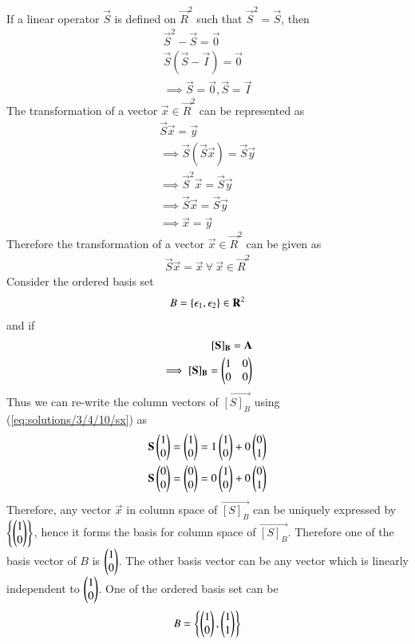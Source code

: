 If a linear operator $\vec{S}$ is defined on $\vec{R}^2$ such that $\vec{S}^2=\vec{S}$, then
\begin{align}
	\vec{S}^2-\vec{S}=\vec{0}\\
	\vec{S}(\vec{S}-\vec{I})=\vec{0}\\
	\implies\vec{S}=\vec{0},\vec{S}=\vec{I}
\end{align}
The transformation of a vector $\vec{x} \in \vec{R}^2$ can be represented as
\begin{align}
	\vec{S}\vec{x}=\vec{y}\\
	\implies \vec{S}(\vec{S}\vec{x})=\vec{S}\vec{y}\\
	\implies \vec{S}^2\vec{x}=\vec{S}\vec{y}\\
	\implies \vec{S}\vec{x}=\vec{S}\vec{y}\\
	\implies \vec{x}=\vec{y}
\end{align}
Therefore the transformation of a vector $\vec{x} \in \vec{R}^2$ can be given as
\begin{align}
	\vec{S}\vec{x}=\vec{x} \ \forall \ \vec{x} \in \vec{R}^2 \label{eq:solutions/3/4/10/sx}
\end{align}
Consider the ordered basis set
\begin{align}
        B=\left\{\epsilon_1,\epsilon_2\right\} \in \mathbf{R}^2
\end{align}
and if
\begin{align}
\mathbf{[S]_B}=\mathbf{A} \\
        \implies \mathbf{[S]_B}=\begin{pmatrix}1&0\\0&0\end{pmatrix}
\end{align}
Thus we can re-write the column vectors of $\vec{[S]_B}$ using (\ref{eq:solutions/3/4/10/sx}) as
\begin{align}
\mathbf{S}\begin{pmatrix}1\\0\end{pmatrix}=\begin{pmatrix}1\\0\end{pmatrix}=1\begin{pmatrix}1\\0\end{pmatrix}+0\begin{pmatrix}0\\1\end{pmatrix} \\
\mathbf{S}\begin{pmatrix}0\\0\end{pmatrix}=\begin{pmatrix}0\\0\end{pmatrix}=0\begin{pmatrix}1\\0\end{pmatrix}+0\begin{pmatrix}0\\1\end{pmatrix}
\end{align}
Therefore, any vector $\vec{x}$ in column space of $\vec{[S]_B}$ can be uniquely expressed by 
$\left\{\begin{pmatrix}1\\0\end{pmatrix}\right\}$, hence it forms the basis for column space of $\vec{[S]_B}$. Therefore 
one of the basis vector of $B$ is $\begin{pmatrix}1\\0\end{pmatrix}$. The other basis vector can be any vector which 
is linearly independent to $\begin{pmatrix}1\\0\end{pmatrix}$. One of the ordered basis set can be 
\begin{align}
	B=\left\{\begin{pmatrix}1\\0\end{pmatrix},\begin{pmatrix}1\\1\end{pmatrix}\right\}
\end{align}
